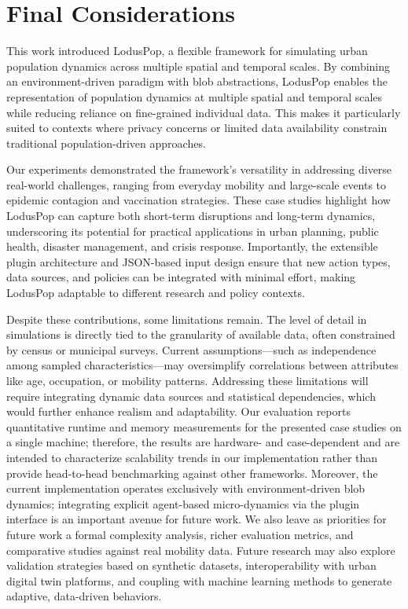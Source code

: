 \documentclass[pdflatex,sn-mathphys-num]{sn-jnl}%
\newcommand\redb[1]{#1}
\newcommand\redc[1]{#1}
\theoremstyle{thmstyleone}%
\theoremstyle{thmstyletwo}%
\theoremstyle{thmstylethree}%
\begin{document}
\section{Final Considerations} 
\label{sec:final_considerations}

This work introduced LodusPop, a flexible framework for simulating urban population dynamics across multiple spatial and temporal scales. 
\redb{By combining an environment-driven paradigm with blob abstractions, LodusPop enables the representation of population dynamics at multiple spatial and temporal scales while reducing reliance on fine-grained individual data.}
This makes it particularly suited to contexts where privacy concerns or limited data availability constrain traditional population-driven approaches.

Our experiments demonstrated the framework’s versatility in addressing diverse real-world challenges, ranging from everyday mobility and large-scale events to epidemic contagion and vaccination strategies. These case studies highlight how LodusPop can capture both short-term disruptions and long-term dynamics, underscoring its potential for practical applications in urban planning, public health, disaster management, and crisis response. Importantly, the extensible plugin architecture and JSON-based input design ensure that new action types, data sources, and policies can be integrated with minimal effort, making LodusPop adaptable to different research and policy contexts.

Despite these contributions, some limitations remain. The level of detail in simulations is directly tied to the granularity of available data, often constrained by census or municipal surveys. Current assumptions—such as independence among sampled characteristics—may oversimplify correlations between attributes like age, occupation, or mobility patterns. Addressing these limitations will require integrating dynamic data sources and statistical dependencies, which would further enhance realism and adaptability.
\redc{Our evaluation reports quantitative runtime and memory measurements for the presented case studies on a single machine; therefore, the results are hardware- and case-dependent and are intended to characterize scalability trends in our implementation rather than provide head-to-head benchmarking against other frameworks.}
%
Moreover, the current implementation operates exclusively with environment-driven blob dynamics; integrating explicit agent-based micro-dynamics via the plugin interface is an important avenue for future work.
We also leave as priorities for future work a formal complexity analysis, richer evaluation metrics, and comparative studies against real mobility data.
Future research may also explore validation strategies based on synthetic datasets, interoperability with urban digital twin platforms, and coupling with machine learning methods to generate adaptive, data-driven behaviors.
\end{document}
